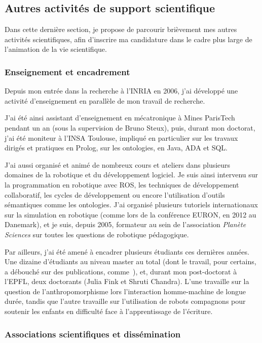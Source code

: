 \documentclass[a4paper]{article}
\begin{document}
\subsection{Autres activités de support scientifique}

Dans cette dernière section, je propose de parcourir brièvement mes autres
activités scientifiques, afin d'inscrire ma candidature dans le cadre plus large
de l'animation de la vie scientifique.

\subsubsection{Enseignement et encadrement}

Depuis mon entrée dans la recherche à l'INRIA en 2006, j'ai développé une
activité d'enseignement en parallèle de mon travail de recherche.

J'ai été ainsi assistant d'enseignement en mécatronique à Mines ParisTech
pendant un an (sous la supervision de Bruno Steux), puis, durant mon doctorat,
j'ai été moniteur à l'INSA Toulouse, impliqué en particulier sur les travaux
dirigés et pratiques en Prolog, sur les ontologies, en Java, ADA et SQL.

J'ai aussi organisé et animé de nombreux cours et ateliers dans plusieurs
domaines de la robotique et du développement logiciel. Je suis ainsi intervenu
sur la programmation en robotique avec ROS, les techniques de développement
collaboratif, les cycles de développement ou encore l'utilisation d'outils
sémantiques comme les ontologies. J'ai organisé plusieurs tutoriels
internationaux sur la simulation en robotique (comme lors de la conférence
EURON, en 2012 au Danemark), et je suis, depuis 2005, formateur au sein de
l'association \emph{Planète Sciences} sur toutes les questions de robotique
pédagogique.

Par ailleurs, j'ai été amené à encadrer plusieurs étudiants ces dernières
années. Une dizaine d'étudiants au niveau master au total (dont le travail, pour
certains, a débouché sur des publications, comme~\cite{Lemaignan2011a}),
et, durant mon post-doctorat à l'EPFL, deux doctorants (Julia Fink et Shruti
Chandra). L'une travaille sur la question de l'anthropomorphisme lors
l'interaction homme-machine de longue durée, tandis que l'autre travaille sur
l'utilisation de robots compagnons pour soutenir les enfants en difficulté face
à l'apprentissage de l'écriture.

\subsubsection{Associations scientifiques et dissémination}
\end{document}
